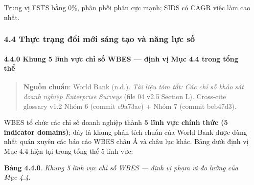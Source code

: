 \documentclass[12pt,a4paper]{article}
\begin{document}
Trung vị FSTS bằng 0\%, phân phối phân cực mạnh; SIDS có CAGR việc làm
cao nhất.

\hypertarget{44-thux1ef1c-trux1ea1ng-ux111ux1ed5i-mux1edbi-suxe1ng-tux1ea1o-vuxe0-nux103ng-lux1ef1c-sux1ed1}{%
\subsubsection{4.4 Thực trạng đổi mới sáng tạo và năng lực
số}\label{44-thux1ef1c-trux1ea1ng-ux111ux1ed5i-mux1edbi-suxe1ng-tux1ea1o-vuxe0-nux103ng-lux1ef1c-sux1ed1}}

\hypertarget{440-khung-5-lux129nh-vux1ef1c-chux1ec9-sux1ed1-wbes--ux111ux1ecbnh-vux1ecb-mux1ee5c-44-trong-tux1ed5ng-thux1ec3}{%
\paragraph{4.4.0 Khung 5 lĩnh vực chỉ số WBES --- định vị Mục 4.4 trong
tổng
thể}\label{440-khung-5-lux129nh-vux1ef1c-chux1ec9-sux1ed1-wbes--ux111ux1ecbnh-vux1ecb-mux1ee5c-44-trong-tux1ed5ng-thux1ec3}}

\begin{quote}
\textbf{Nguồn chuẩn}: World Bank (n.d.). \emph{Tài liệu tóm tắt: Các chỉ
số khảo sát doanh nghiệp Enterprise Surveys} (file 04 v2.5 Section L).
Cross-cite glossary v1.2 Nhóm 6 (commit e9a73ae) + Nhóm 7 (commit
beb47d3).
\end{quote}

WBES tổ chức các chỉ số doanh nghiệp thành \textbf{5 lĩnh vực chính thức
(5 indicator domains)}; đây là khung phân tích chuẩn của World Bank được
dùng nhất quán xuyên các báo cáo WBES châu Á và châu lục khác. Bảng dưới
định vị Mục 4.4 hiện tại trong tổng thể 5 lĩnh vực:

\textbf{Bảng 4.4.0}. \emph{Khung 5 lĩnh vực chỉ số WBES --- định vị phạm
vi đo lường của Mục 4.4.}
\end{document}
